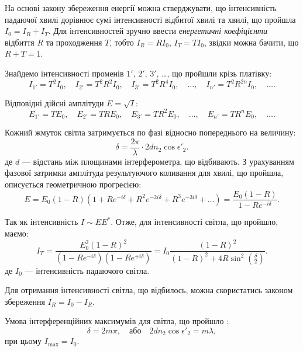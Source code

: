 На основі закону збереження енергії можна стверджувати, що інтенсивність падаючої хвилі дорівнює сумі інтенсивності відбитої хвилі та хвилі, що пройшла $ I_0  = I_R + I_T$. Для інтенсивностей зручно ввести \emph{енергетичні коефіцієнти} відбиття $ R $ та проходження $ T $, тобто $ I_R = R I_0  $,  $ I_T = T I_0 $, звідки можна бачити, що $R + T = 1$.

Знайдемо інтенсивності променів $ 1'$, $ 2' $, $ 3'$, \ldots{}, що пройшли крізь платівку:
\begin{equation*}
	I_{1'}= T^2 I_0 , \quad I_{2'} = T^2R^2 I_0, \quad   I_{3'} = T^2R^4 I_0 ,   \quad   \ldots ,\quad  I_{n'} = T^2R^{2n} I_0, \quad
	\ldots.
\end{equation*}

Відповідні дійсні амплітуди $ E = \sqrt{I} $:
\begin{equation*}
	E_{1'} = T E_0 , \quad
	E_{2'} = TR E_0, \quad
	E_{3'} = TR^2 E_0 , \quad
	\ldots, \quad
	E_{n'} = TR^{n} E_0, \quad
	\ldots.
\end{equation*}

Кожний жмуток світла затримується по
фазі відносно попереднього на
величину:
\begin{equation}\label{eq:delta_manyrays}
	\delta = \frac{2\pi}\lambda\cdot 2dn_2\cos\epsilon'_2.
\end{equation}
де $ d $ --- відстань між площинами інтерферометра, що відбивають. З урахуванням фазової затримки амплітуда результуючого коливання для хвилі, що пройшла, описується геометричною прогресією:
\begin{equation*}
	E = E_0(1-R)(1 + R e^{-i\delta} + R^2 e^{-2i\delta} + R^3 e^{-3i\delta} + \ldots ) = \frac{E_0(1-R)}{1 - R e^{-i\delta}}.
\end{equation*}


Так як інтенсивність $I \sim EE^*$.  Отже, для інтенсивності світла, що пройшло, маємо:
\begin{equation}\label{eq:I_traversed}
	I_T = \frac{E_0^2 (1-R)^2}{(1 - R e^{-i\delta})(1 - R e^{+i\delta})} = I_0 \frac{(1-R)^2}{(1-R)^2 + 4R\sin^2\left( \frac{\delta}{2}\right) }.
\end{equation}
де $I_0$ --- інтенсивність падаючого світла.

Для отримання інтенсивності світла, що відбилось, можна скористатись законом збереження $I_R = I_0 -  I_R$.

Умова інтерференційних максимумів для  світла, що пройшло :
\begin{equation}\label{eq:delta=max_manyrays}
	\delta = 2m\pi,\quad \text{або}\quad 2 dn_2\cos\epsilon'_2 = m\lambda,
\end{equation}
при цьому $I_{\max} = I_0$.

